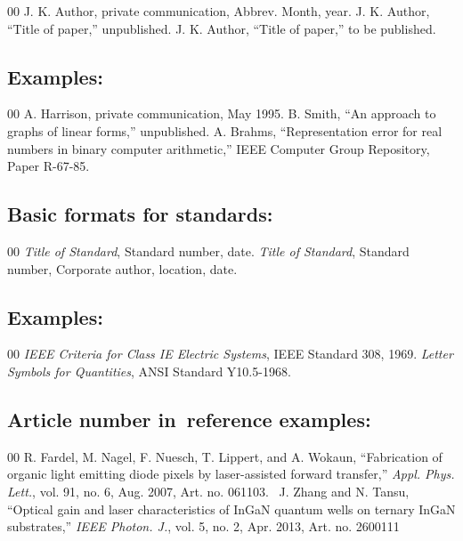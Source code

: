 \documentclass{IEEEtran}
\begin{document}
\begin{thebibliography}{00}
 J. K. Author, private communication, Abbrev. Month, year.
 J. K. Author, ``Title of paper,'' unpublished.
 J. K. Author, ``Title of paper,'' to be published.
\end{thebibliography}

\subsection*{Examples:}

\begin{thebibliography}{00}
 A. Harrison, private communication, May 1995.
 B. Smith, ``An approach to graphs of linear forms,'' unpublished.
 A. Brahms, ``Representation error for real numbers in binary computer arithmetic,'' IEEE Computer Group Repository, Paper R-67-85.
\end{thebibliography}

\subsection*{Basic formats for standards:}

\begin{thebibliography}{00}
 \textit{Title of Standard}, Standard number, date.
 \textit{Title of Standard}, Standard number, Corporate author, location, date.
\end{thebibliography}

\subsection*{Examples:}

\begin{thebibliography}{00}
 \emph{IEEE Criteria for Class IE Electric Systems}, IEEE Standard 308, 1969.
 \emph{Letter Symbols for Quantities}, ANSI Standard Y10.5-1968.
\end{thebibliography}

\subsection*{Article number in~reference examples:}

\begin{thebibliography}{00}
 R. Fardel, M. Nagel, F. Nuesch, T. Lippert, and A. Wokaun, ``Fabrication of organic light emitting diode pixels by laser-assisted forward transfer,'' \textit{Appl. Phys. Lett.}, vol. 91, no. 6, Aug. 2007, Art. no. 061103.~
 J. Zhang and N. Tansu, ``Optical gain and laser characteristics of InGaN quantum wells on ternary InGaN substrates,'' \textit{IEEE Photon. J.}, vol. 5, no. 2, Apr. 2013, Art. no. 2600111
\end{thebibliography}
\end{document}
